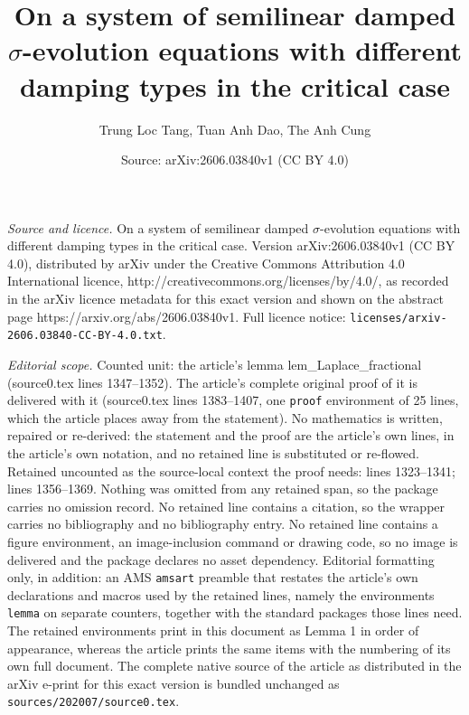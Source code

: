 \documentclass[10pt,a4paper]{amsart}
\title{On a system of semilinear damped $\sigma$-evolution equations with different damping types in the critical case}
\author{Trung Loc Tang, Tuan Anh Dao, The Anh Cung}
\date{Source: arXiv:2606.03840v1 (CC BY 4.0)}
\begin{document}
\maketitle

\noindent\emph{Source and licence.} On a system of semilinear damped $\sigma$-evolution equations with different damping types in the critical case. Version arXiv:2606.03840v1 (CC BY 4.0), distributed by arXiv under the Creative Commons Attribution 4.0 International licence, http://creativecommons.org/licenses/by/4.0/, as recorded in the arXiv licence metadata for this exact version and shown on the abstract page https://arxiv.org/abs/2606.03840v1. Full licence notice: \texttt{licenses/arxiv-2606.03840-CC-BY-4.0.txt}.\par\smallskip

\noindent\textit{Editorial scope.} Counted unit: the article's lemma lem\_Laplace\_fractional (source0.tex lines 1347--1352). The article's complete original proof of it is delivered with it (source0.tex lines 1383--1407, one \texttt{proof} environment of 25 lines, which the article places away from the statement). No mathematics is written, repaired or re-derived: the statement and the proof are the article's own lines, in the article's own notation, and no retained line is substituted or re-flowed.  Retained uncounted as the source-local context the proof needs: lines 1323--1341; lines 1356--1369.  Nothing was omitted from any retained span, so the package carries no omission record.  No retained line contains a citation, so the wrapper carries no bibliography and no bibliography entry.  No retained line contains a figure environment, an image-inclusion command or drawing code, so no image is delivered and the package declares no asset dependency.  Editorial formatting only, in addition: an AMS \texttt{amsart} preamble that restates the article's own declarations and macros used by the retained lines, namely the environments \texttt{lemma} on separate counters, together with the standard packages those lines need.  The retained environments print in this document as Lemma 1 in order of appearance, whereas the article prints the same items with the numbering of its own full document.  The complete native source of the article as distributed in the arXiv e-print for this exact version is bundled unchanged as \texttt{sources/202007/source0.tex}.
\end{document}
